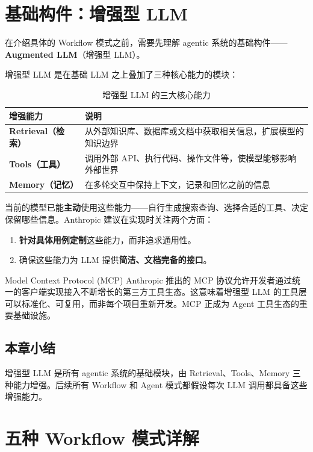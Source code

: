 \documentclass[a4paper]{article}
\begin{document}
\section{基础构件：增强型 LLM}

在介绍具体的 Workflow 模式之前，需要先理解 agentic 系统的基础构件——\textbf{Augmented LLM}（增强型 LLM）。

增强型 LLM 是在基础 LLM 之上叠加了三种核心能力的模块：

\begin{table}[H]
\centering
\begin{tabular}{>{\bfseries}l p{10cm}}
\toprule
增强能力 & 说明 \\
\midrule
Retrieval（检索） & 从外部知识库、数据库或文档中获取相关信息，扩展模型的知识边界 \\
Tools（工具） & 调用外部 API、执行代码、操作文件等，使模型能够影响外部世界 \\
Memory（记忆） & 在多轮交互中保持上下文，记录和回忆之前的信息 \\
\bottomrule
\end{tabular}
\caption{增强型 LLM 的三大核心能力}
\end{table}

当前的模型已能\textbf{主动}使用这些能力——自行生成搜索查询、选择合适的工具、决定保留哪些信息。Anthropic 建议在实现时关注两个方面：

\begin{enumerate}
    \item \textbf{针对具体用例定制}这些能力，而非追求通用性。
    \item 确保这些能力为 LLM 提供\textbf{简洁、文档完备的接口}。
\end{enumerate}

\begin{knowledgebox}{Model Context Protocol (MCP)}
Anthropic 推出的 MCP 协议允许开发者通过统一的客户端实现接入不断增长的第三方工具生态。这意味着增强型 LLM 的工具层可以标准化、可复用，而非每个项目重新开发。MCP 正成为 Agent 工具生态的重要基础设施。
\end{knowledgebox}

\subsection{本章小结}
增强型 LLM 是所有 agentic 系统的基础模块，由 Retrieval、Tools、Memory 三种能力增强。后续所有 Workflow 和 Agent 模式都假设每次 LLM 调用都具备这些增强能力。


\section{五种 Workflow 模式详解}
\end{document}
